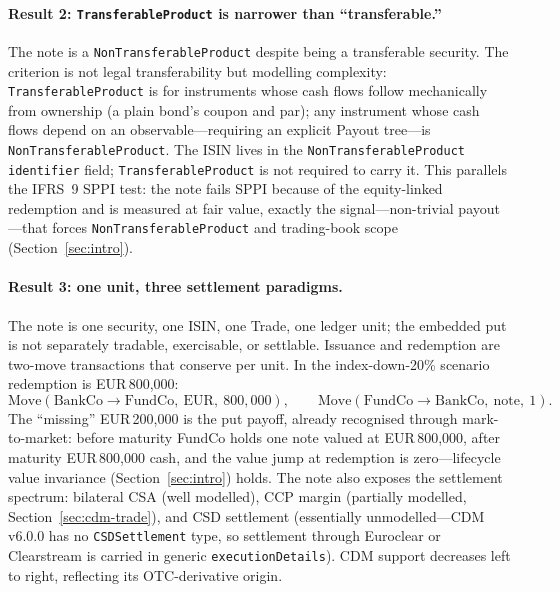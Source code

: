\documentclass[11pt,a4paper]{article}
\begin{document}
\paragraph{Result 2: \texttt{Transferable\allowbreak Product} is narrower than ``transferable.''} The note is a \texttt{Non\allowbreak Transferable\allowbreak Product} despite being a transferable security. The criterion is not legal transferability but modelling complexity: \texttt{Transferable\allowbreak Product} is for instruments whose cash flows follow mechanically from ownership (a plain bond's coupon and par); any instrument whose cash flows depend on an observable---requiring an explicit Payout tree---is \texttt{Non\allowbreak Transferable\allowbreak Product}. The ISIN lives in the \texttt{Non\allowbreak Transferable\allowbreak Product} \texttt{identifier} field; \texttt{Transferable\allowbreak Product} is not required to carry it. This parallels the IFRS~9 SPPI test: the note fails SPPI because of the equity-linked redemption and is measured at fair value, exactly the signal---non-trivial payout---that forces \texttt{Non\allowbreak Transferable\allowbreak Product} and trading-book scope (Section~\ref{sec:intro}).

\paragraph{Result 3: one unit, three settlement paradigms.} The note is one security, one ISIN, one Trade, one ledger unit; the embedded put is not separately tradable, exercisable, or settlable. Issuance and redemption are two-move transactions that conserve per unit. In the index-down-20\% scenario redemption is EUR\,800{,}000:
\[
\text{Move}(\text{BankCo}\to\text{FundCo},\ \text{EUR},\ 800{,}000),\qquad
\text{Move}(\text{FundCo}\to\text{BankCo},\ \text{note},\ 1).
\]
The ``missing'' EUR\,200{,}000 is the put payoff, already recognised through mark-to-market: before maturity FundCo holds one note valued at EUR\,800{,}000, after maturity EUR\,800{,}000 cash, and the value jump at redemption is zero---lifecycle value invariance (Section~\ref{sec:intro}) holds. The note also exposes the settlement spectrum: bilateral CSA (well modelled), CCP margin (partially modelled, Section~\ref{sec:cdm-trade}), and CSD settlement (essentially unmodelled---CDM v6.0.0 has no \texttt{CSDSettlement} type, so settlement through Euroclear or Clearstream is carried in generic \texttt{executionDetails}). CDM support decreases left to right, reflecting its OTC-derivative origin.
\end{document}
